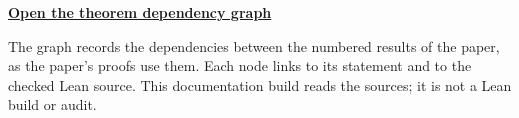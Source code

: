 \documentclass[11pt]{article}
\begin{document}
\maketitle
\noindent\href{dependency-graph.svg}{\textbf{Open the theorem dependency graph}}\par
The graph records the dependencies between the numbered results of the paper, as the paper's
proofs use them. Each node links to its statement and to the checked Lean source. This
documentation build reads the sources; it is not a Lean build or audit.
\tableofcontents

\end{document}

